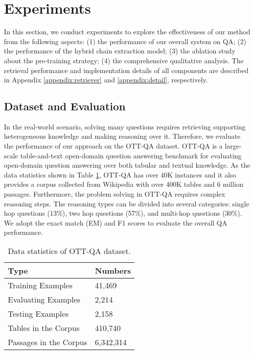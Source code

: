 \documentclass[11pt]{article}
\begin{document}
	\section{Experiments}
	In this section, we conduct experiments to explore the effectiveness of our method from the following aspects: 
	(1) the performance of our overall system on QA;
	(2) the performance of the hybrid chain extraction model; 
	(3) the ablation study about the pre-training strategy;
	(4) the comprehensive qualitative analysis.
	The retrieval performance and implementation details of all components are described in Appendix \ref{appendix:retriever} and \ref{appendix:detail}, respectively.
	\subsection{Dataset and Evaluation}
	In the real-world scenario, solving many questions requires retrieving supporting heterogeneous knowledge and making reasoning over it.
	Therefore, we evaluate the performance of our approach on the OTT-QA \cite{chen2020open} dataset. 
	OTT-QA is a large-scale table-and-text open-domain question answering benchmark for evaluating open-domain question answering over both tabular and textual knowledge. 
	As the data statistics shown in Table \ref{tab:data-statistic}, OTT-QA has over 40K instances and it also provides a corpus collected from Wikipedia with over 400K tables and 6 million passages. 
	Furthermore, the problem solving in OTT-QA requires complex reasoning steps.
	The reasoning types can be divided into several categories: single hop questions (13\%), two hop questions (57\%), and multi-hop questions (30\%).
We adopt the exact match (EM) and F1 scores \cite{spider} to evaluate the overall QA performance. 
	\begin{table}[h]
		\centering
		\begin{tabular}{ll}
			\hline
			Type & Numbers \\
			\hline
			Training Examples                               & 41,469  \\ 
			Evaluating Examples  & 2,214          \\
			Testing Examples    & 2,158     \\
			Tables in the Corpus  &  410,740         \\
			Passages in the Corpus & 6,342,314 \\ 
\hline
		\end{tabular}
		\caption{Data statistics of OTT-QA dataset.}
		\label{tab:data-statistic}
	\end{table}
	
\end{document}

